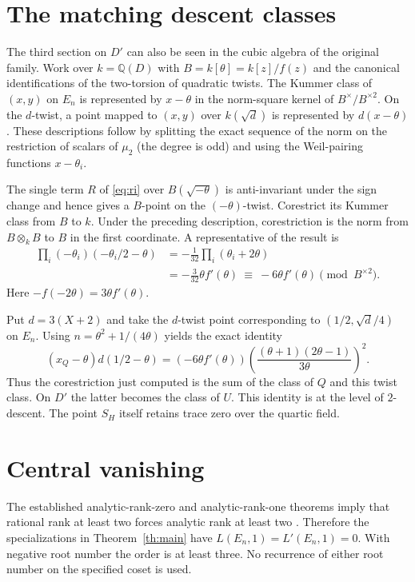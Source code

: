\documentclass[11pt]{article}
\newcommand{\Q}{\mathbb Q}
\begin{document}
\section{The matching descent classes}\label{sec:descent}

The third section on $D'$ can also be seen in the cubic algebra of the
original family. Work over $k=\Q(D)$ with $B=k[\theta]=k[z]/f(z)$ and the
canonical identifications of the two-torsion of quadratic twists.
The Kummer class of $(x,y)$ on $E_n$ is represented by $x-\theta$
in the norm-square kernel of $B^\times/B^{\times2}$. On the $d$-twist,
a point mapped to $(x,y)$ over $k(\sqrt d)$ is represented by
$d(x-\theta)$. These descriptions follow by splitting the exact sequence
of the norm on the restriction of scalars of $\mu_2$ (the degree is
odd) and using the Weil-pairing functions $x-\theta_i$.

The single term $R$ of \eqref{eq:ri} over $B(\sqrt{-\theta})$ is
anti-invariant under the sign change and hence gives a $B$-point on the
$(-\theta)$-twist. Corestrict its Kummer class from $B$ to $k$.
Under the preceding description, corestriction is the norm from
$B\otimes_k B$ to $B$ in the first coordinate. A representative
of the result is
\begin{align*}
\prod_i(-\theta_i)(-\theta_i/2-\theta)
 &= -\frac{1}{32}\prod_i(\theta_i+2\theta)\\
 &= -\frac{3}{32}\theta f'(\theta)
 \ \equiv\ -6\theta f'(\theta)\pmod {B^{\times2}}.
\end{align*}
Here $-f(-2\theta)=3\theta f'(\theta)$.

Put $d=3(X+2)$ and take the $d$-twist point corresponding to
$(1/2,\sqrt d/4)$ on $E_n$. Using $n=\theta^2+1/(4\theta)$ yields
the exact identity
\[
 (x_Q-\theta)d(1/2-\theta)=
 (-6\theta f'(\theta))
 \left(\frac{(\theta+1)(2\theta-1)}{3\theta}\right)^2 .
\]
Thus the corestriction just computed is the sum of the class of $Q$
and this twist class. On $D'$ the latter becomes the class of $U$.
This identity is at the level of $2$-descent. The point $S_H$ itself
retains trace zero over the quartic field.

\section{Central vanishing}

The established analytic-rank-zero and analytic-rank-one theorems
imply that rational rank at least two forces analytic rank at least
two \cite{Clay}. Therefore the specializations in
Theorem~\ref{th:main} have $L(E_n,1)=L'(E_n,1)=0$.
With negative root number the order is at least three. No recurrence
of either root number on the specified coset is used.
\end{document}
